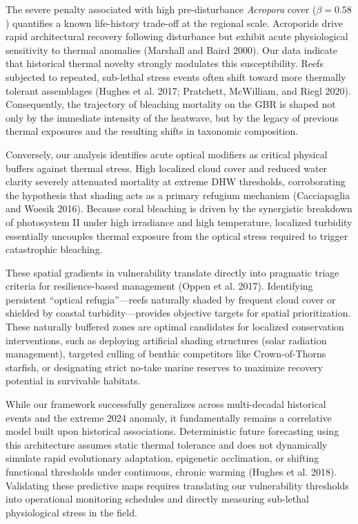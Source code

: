 \documentclass[
  letterpaper,
  DIV=11,
  numbers=noendperiod]{scrartcl}
\begin{document}
The severe penalty associated with high pre-disturbance \emph{Acropora}
cover (\(\beta = 0.58\)) quantifies a known life-history trade-off at
the regional scale. Acroporids drive rapid architectural recovery
following disturbance but exhibit acute physiological sensitivity to
thermal anomalies (Marshall and Baird 2000). Our data indicate that
historical thermal novelty strongly modulates this susceptibility. Reefs
subjected to repeated, sub-lethal stress events often shift toward more
thermally tolerant assemblages (Hughes et al. 2017; Pratchett,
McWilliam, and Riegl 2020). Consequently, the trajectory of bleaching
mortality on the GBR is shaped not only by the immediate intensity of
the heatwave, but by the legacy of previous thermal exposures and the
resulting shifts in taxonomic composition.

Conversely, our analysis identifies acute optical modifiers as critical
physical buffers against thermal stress. High localized cloud cover and
reduced water clarity severely attenuated mortality at extreme DHW
thresholds, corroborating the hypothesis that shading acts as a primary
refugium mechanism (Cacciapaglia and Woesik 2016). Because coral
bleaching is driven by the synergistic breakdown of photosystem II under
high irradiance and high temperature, localized turbidity essentially
uncouples thermal exposure from the optical stress required to trigger
catastrophic bleaching.

These spatial gradients in vulnerability translate directly into
pragmatic triage criteria for resilience-based management (Oppen et al.
2017). Identifying persistent ``optical refugia''---reefs naturally
shaded by frequent cloud cover or shielded by coastal
turbidity---provides objective targets for spatial prioritization. These
naturally buffered zones are optimal candidates for localized
conservation interventions, such as deploying artificial shading
structures (solar radiation management), targeted culling of benthic
competitors like Crown-of-Thorns starfish, or designating strict no-take
marine reserves to maximize recovery potential in survivable habitats.

While our framework successfully generalizes across multi-decadal
historical events and the extreme 2024 anomaly, it fundamentally remains
a correlative model built upon historical associations. Deterministic
future forecasting using this architecture assumes static thermal
tolerance and does not dynamically simulate rapid evolutionary
adaptation, epigenetic acclimation, or shifting functional thresholds
under continuous, chronic warming (Hughes et al. 2018). Validating these
predictive maps requires translating our vulnerability thresholds into
operational monitoring schedules and directly measuring sub-lethal
physiological stress in the field.
\end{document}
